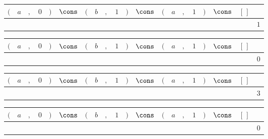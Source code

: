{\scriptsize\setlength{\tabcolsep}{1.5pt}%
\begin{tabular}{ccccccccccccccccccc|l}
$($ & $a$ & $,$ & $0$ & $)$ & $\cons$ & $($ & $b$ & $,$ & $1$ & $)$ & $\cons$ & $($ & $a$ & $,$ & $1$ & $)$ & $\cons$ & $[\,]$ & \\ \hline
\gcell{$$} & \gcell{$\posC{\circ}$} & \gcell{$\posC{\circ}$} & \gcell{$\posD{\bullet}$} & \gcell{$$} & \gcell{$\posC{\circ}$} & \gcell{$$} & \gcell{$\posC{\circ}$} & \gcell{$\posC{\circ}$} & \gcell{$$} & \gcell{$$} & \gcell{$\posC{\circ}$} & \gcell{$$} & \gcell{$\posC{\circ}$} & \gcell{$\posC{\circ}$} & \gcell{$\posD{\bullet}$} & \gcell{$$} & \gcell{$\posC{\circ}$} & \gcell{$\posC{\circ}$} & $1$ \\
\end{tabular}}
{\scriptsize\setlength{\tabcolsep}{1.5pt}%
\begin{tabular}{ccccccccccccccccccc|l}
$($ & $a$ & $,$ & $0$ & $)$ & $\cons$ & $($ & $b$ & $,$ & $1$ & $)$ & $\cons$ & $($ & $a$ & $,$ & $1$ & $)$ & $\cons$ & $[\,]$ & \\ \hline
\gcell{$$} & \gcell{$$} & \gcell{$$} & \gcell{$$} & \gcell{$$} & \gcell{$$} & \gcell{$$} & \gcell{$$} & \gcell{$$} & \gcell{$$} & \gcell{$$} & \gcell{$$} & \gcell{$$} & \gcell{$$} & \gcell{$$} & \gcell{$$} & \gcell{$$} & \gcell{$$} & \gcell{$$} & $0$ \\
\end{tabular}}
{\scriptsize\setlength{\tabcolsep}{1.5pt}%
\begin{tabular}{ccccccccccccccccccc|l}
$($ & $a$ & $,$ & $0$ & $)$ & $\cons$ & $($ & $b$ & $,$ & $1$ & $)$ & $\cons$ & $($ & $a$ & $,$ & $1$ & $)$ & $\cons$ & $[\,]$ & \\ \hline
\gcell{$$} & \gcell{$$} & \gcell{$$} & \gcell{$$} & \gcell{$$} & \gcell{$\posC{\circ}$} & \gcell{$$} & \gcell{$$} & \gcell{$$} & \gcell{$$} & \gcell{$$} & \gcell{$\posC{\circ}$} & \gcell{$$} & \gcell{$$} & \gcell{$$} & \gcell{$$} & \gcell{$$} & \gcell{$\posC{\circ}$} & \gcell{$\posC{\circ}$} & $3$ \\
\end{tabular}}
{\scriptsize\setlength{\tabcolsep}{1.5pt}%
\begin{tabular}{ccccccccccccccccccc|l}
$($ & $a$ & $,$ & $0$ & $)$ & $\cons$ & $($ & $b$ & $,$ & $1$ & $)$ & $\cons$ & $($ & $a$ & $,$ & $1$ & $)$ & $\cons$ & $[\,]$ & \\ \hline
\gcell{$$} & \gcell{$$} & \gcell{$$} & \gcell{$$} & \gcell{$$} & \gcell{$$} & \gcell{$$} & \gcell{$$} & \gcell{$$} & \gcell{$$} & \gcell{$$} & \gcell{$$} & \gcell{$$} & \gcell{$$} & \gcell{$$} & \gcell{$$} & \gcell{$$} & \gcell{$$} & \gcell{$$} & $0$ \\
\end{tabular}}
